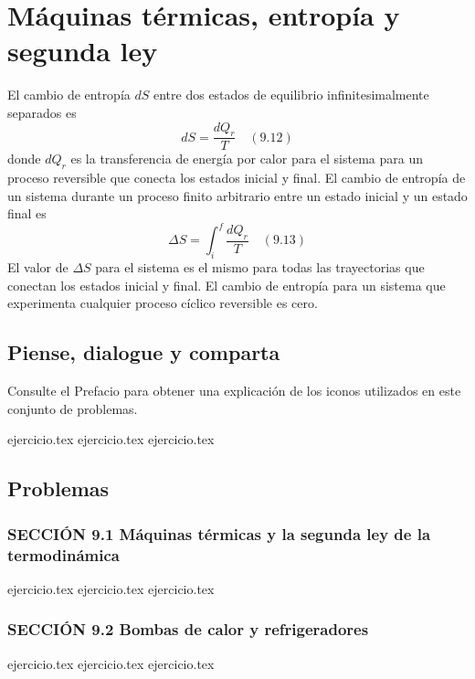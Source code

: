 \chapter{Máquinas térmicas, entropía y segunda ley}
\label{cap:segunda_ley}

El cambio de entropía $dS$ entre dos estados de equilibrio infinitesimalmente separados es
$$ dS = \frac{dQ_r}{T} \quad (9.12) $$
donde $dQ_r$ es la transferencia de energía por calor para el sistema para un proceso reversible que conecta los estados inicial y final.
El cambio de entropía de un sistema durante un proceso finito arbitrario entre un estado inicial y un estado final es
$$ \Delta S = \int_i^f \frac{dQ_r}{T} \quad (9.13) $$
El valor de $\Delta S$ para el sistema es el mismo para todas las trayectorias que conectan los estados inicial y final. El cambio de entropía para un sistema que experimenta cualquier proceso cíclico reversible es cero.

\section*{Piense, dialogue y comparta}
Consulte el Prefacio para obtener una explicación de los iconos utilizados en este conjunto de problemas.

\begin{enumerate}
    {ejercicio.tex}
    {ejercicio.tex}
    {ejercicio.tex}
\end{enumerate}

\section*{Problemas}

\subsection*{SECCIÓN 9.1 Máquinas térmicas y la segunda ley de la termodinámica}
\begin{enumerate}
    {ejercicio.tex}
    {ejercicio.tex}
    {ejercicio.tex}
\end{enumerate}

\subsection*{SECCIÓN 9.2 Bombas de calor y refrigeradores}
\begin{enumerate}
    \setcounter{enumi}{3}
    {ejercicio.tex}
    {ejercicio.tex}
    {ejercicio.tex}
\end{enumerate}


